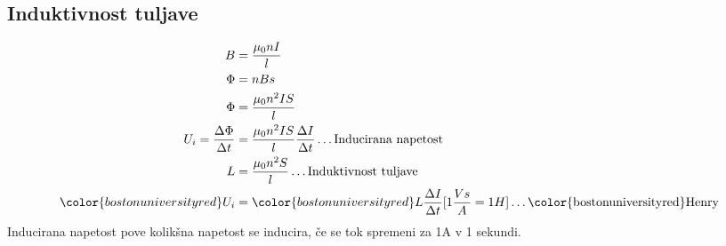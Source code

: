 {\color{indiagreen}\subsection{Induktivnost tuljave}}
\begin{align*}
	B &= \frac{\mu_0 nI}{l}\\
	\Phi &= nBs\\
	\Phi &= \frac{\mu_0 n^2 IS}{l}\\
	U_i = \frac{\Delta \Phi}{\Delta t} &= \frac{\mu_0 n^2 IS}{l} \frac{\Delta I}{\Delta t} \dots \text{Inducirana napetost}\\
	L &= \frac{\mu_0 n^2 S}{l} \dots \text{Induktivnost tuljave}\\
	{\color{bostonuniversityred}U_i} &= {\color{bostonuniversityred}L \frac{\Delta I}{\Delta t}} [1\frac{Vs}{A} = 1H] \dots \text{{\color{bostonuniversityred}Henry}}\\
\end{align*}
Inducirana napetost pove kolikšna napetost se inducira, če se tok spremeni za 1A v 1 sekundi.\\

